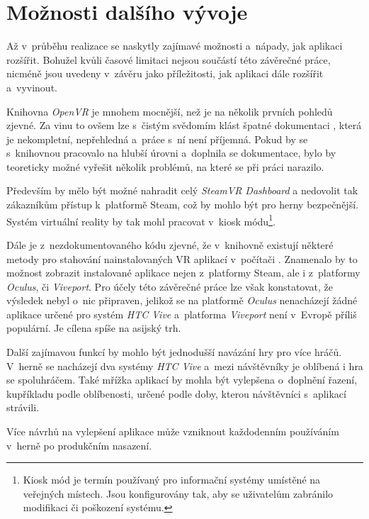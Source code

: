 \section{Možnosti dalšího
vývoje}\label{moux17enosti-dalux161uxedho-vuxfdvoje}

Až v~průběhu realizace se naskytly zajímavé možnosti a~nápady, jak
aplikaci rozšířit. Bohužel kvůli časové limitaci nejsou součástí této
závěrečné práce, nicméně jsou uvedeny v~závěru jako příležitosti, jak
aplikaci dále rozšířit a~vyvinout.

Knihovna \emph{OpenVR} je mnohem mocnější, než je na několik prvních pohledů
zjevné. Za vinu to ovšem lze s~čistým svědomím klást špatné dokumentaci \autocite{openvrdocs},
která je nekompletní, nepřehledná a~práce s~ní není příjemná. Pokud by
se s~knihovnou pracovalo na hlubší úrovni a~doplnila se dokumentace,
bylo by teoreticky možné vyřešit několik problémů, na které se při práci narazilo.

Především by mělo být možné nahradit celý \emph{SteamVR Dashboard} a
nedovolit tak zákazníkům přístup k~platformě Steam, což by mohlo být pro
herny bezpečnější. Systém virtuální reality by tak mohl pracovat
v~kiosk módu\footnote{Kiosk mód je termín používaný pro informační systémy umístěné na veřejných místech. Jsou konfigurovány tak, aby se uživatelům zabránilo modifikaci či poškození systému.}. 

Dále je z~nezdokumentovaného kódu zjevné, že
v~knihovně existují některé metody pro stahování nainstalovaných VR
aplikací v~počítači \autocite{openvrhidden}. Znamenalo by to možnost zobrazit instalované aplikace
nejen z~platformy Steam, ale i z~platformy \emph{Oculus}, či \emph{Viveport}. Pro
účely této závěrečné práce lze však konstatovat, že výsledek nebyl o~nic
připraven, jelikož se na platformě \emph{Oculus} nenacházejí žádné aplikace
určené pro systém \emph{HTC Vive} a~platforma \emph{Viveport} není v~Evropě příliš
populární. Je cílena spíše na asijský trh. \autocite{viveportasia}

Další zajímavou funkcí by mohlo být jednodušší navázání hry pro více
hráčů. V~herně se nacházejí dva systémy \emph{HTC Vive} a~mezi návštěvníky je
oblíbená i hra se spoluhráčem. Také mřížka aplikací by mohla být vylepšena
o~doplnění řazení, kupříkladu podle oblíbenosti, určené podle doby, kterou
návštěvníci s~aplikací strávili.

Více návrhů na vylepšení aplikace může vzniknout každodenním používáním
v~herně po produkčním nasazení.
